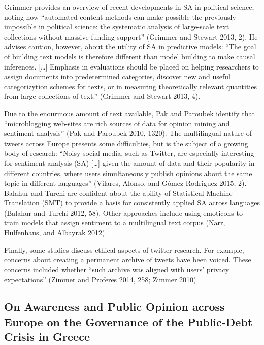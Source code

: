 \documentclass[]{article}
\begin{document}
Grimmer provides an overview of recent developments in SA in political
science, noting how ``automated content methods can make possible the
previously impossible in political science: the systematic analysis of
large-scale text collections without massive funding support'' (Grimmer
and Stewart 2013, 2). He advises caution, however, about the utility of
SA in predictive models: ``The goal of building text models is therefore
different than model building to make causal inferences. {[}\ldots{}{]}
Emphasis in evaluations should be placed on helping researchers to
assign documents into predetermined categories, discover new and useful
categorizytion schemes for texts, or in measuring theoretically relevant
quantities from large collections of text.'' (Grimmer and Stewart 2013,
4).

Due to the enourmous amount of text available, Pak and Paroubek identify
that ``microblogging web-sites are rich sources of data for opinion
mining and sentiment analysis'' (Pak and Paroubek 2010, 1320). The
multilingual nature of tweets across Europe presents some difficulties,
but is the subject of a growing body of research: ``Noisy social media,
such as Twitter, are especially interesting for sentiment analysis (SA)
{[}\ldots{}{]} given the amount of data and their popularity in
different countries, where users simultaneously publish opinions about
the same topic in different languages'' (Vilares, Alonso, and
G{ó}mez-Rodr{i}guez 2015, 2). Balahur and Turchi are confident about the
ability of Statistical Machine Translation (SMT) to provide a basis for
consistently applied SA across languages (Balahur and Turchi 2012, 58).
Other approaches include using emoticons to train models that assign
sentiment to a multilingual text corpus (Narr, Hulfenhaus, and Albayrak
2012).

Finally, some studies discuss ethical aspects of twitter research. For
example, concerns about creating a permanent archive of tweets have been
voiced. These concerns included whether ``such archive was aligned with
users' privacy expectations'' (Zimmer and Proferes 2014, 258; Zimmer
2010).

\subsection{On Awareness and Public Opinion across Europe on the
Governance of the Public-Debt Crisis in
Greece}\label{on-awareness-and-public-opinion-across-europe-on-the-governance-of-the-public-debt-crisis-in-greece}
\end{document}
